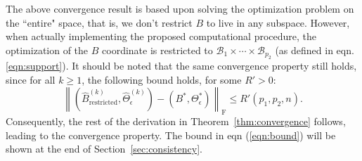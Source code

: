 \begin{remark}
The above convergence result is based upon solving the optimization problem on the ``entire" space, that is, we don't restrict $B$ to live in any subspace. However, when actually implementing the proposed computational procedure, the optimization of the $B$ coordinate is restricted to $\mathcal{B}_1\times\cdots\times \mathcal{B}_{p_2}$ (as defined in eqn.\ref{eqn:support}). It should be noted that the same convergence property still holds, since for all $k\geq 1$, the following bound holds, for some $R'>0$: 
\begin{equation}\label{eqn:bound}
\left\|\left(\widehat{B}^{(k)}_{\text{restricted}},\widehat{\Theta}^{(k)}_\epsilon\right) - \left(B^*,\Theta_\epsilon^*\right)\right\|_\text{F}\leq R'(p_1,p_2,n).
\end{equation}
Consequently, the rest of the derivation in Theorem~\ref{thm:convergence} follows, leading to the convergence property. The bound in eqn (\ref{eqn:bound}) will be shown at the end of Section~\ref{sec:consistency}.  
\end{remark} 

